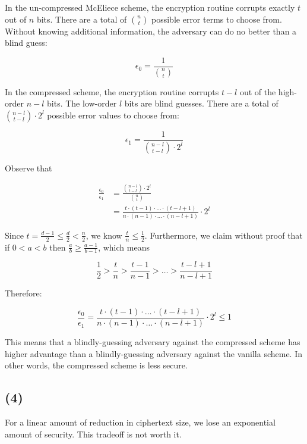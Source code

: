\documentclass{article}
\begin{document}
In the un-compressed McEliece scheme, the encryption routine corrupts exactly $t$ out of $n$ bits. There are a total of $\binom{n}{t}$ possible error terms to choose from. Without knowing additional information, the adversary can do no better than a blind guess:

\begin{equation*}
    \epsilon_0 = \frac{1}{\binom{n}{t}}
\end{equation*}

In the compressed scheme, the encryption routine corrupts $t-l$ out of the high-order $n-l$ bits. The low-order $l$ bits are blind guesses. There are a total of $\binom{n-l}{t-l} \cdot 2^l$ possible error values to choose from:

\begin{equation*}
    \epsilon_1 = \frac{1}{\binom{n-l}{t-l} \cdot 2^l}
\end{equation*}

Observe that

$$
\begin{aligned}
    \frac{\epsilon_0}{\epsilon_1} 
    &= \frac{\binom{n-l}{t-l} \cdot 2^l}{\binom{n}{t}} \\
    &= \frac{
        t \cdot (t-1) \cdot \ldots \cdot (t - l + 1)
    }{
        n \cdot (n-1) \cdot \ldots \cdot (n - l + 1)
    } \cdot 2^l
\end{aligned}
$$

Since $t = \frac{d-1}{2} \leq \frac{d}{2} < \frac{n}{2}$, we know $\frac{t}{n} \leq \frac{1}{2}$. Furthermore, we claim without proof that if $0 < a < b$ then $\frac{a}{b} \geq \frac{a-1}{b-1}$, which means

$$
\frac{1}{2} > \frac{t}{n} > \frac{t-1}{n-1} > \ldots > \frac{t-l+1}{n-l+1}
$$

Therefore:

$$
\frac{\epsilon_0}{\epsilon_1} = \frac{
    t \cdot (t-1) \cdot \ldots \cdot (t - l + 1)
}{
    n \cdot (n-1) \cdot \ldots \cdot (n - l + 1)
} \cdot 2^l \leq 1
$$

This means that a blindly-guessing adversary against the compressed scheme has higher advantage than a blindly-guessing adversary against the vanilla scheme. In other words, the compressed scheme is less secure.

\subsection*{(4)}
For a linear amount of reduction in ciphertext size, we lose an exponential amount of security. This tradeoff is not worth it.
\end{document}
